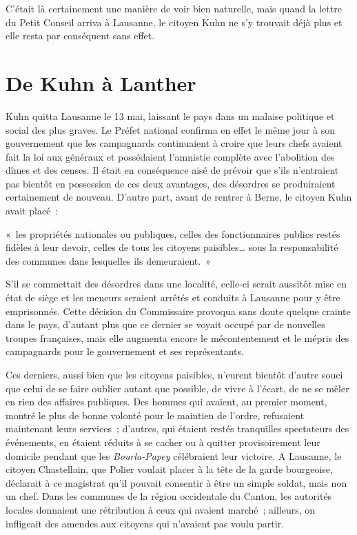 \documentclass[french,twoside]{book} %
\newenvironment{quoteblock}%
  {\begin{quoting}}
  {\end{quoting}}
\newenvironment{quotebar}{%
    \def\FrameCommand{{\color{rubric!10!}\vrule width 0.5em} \hspace{0.9em}}%
    \def\OuterFrameSep{\itemsep} %
    \MakeFramed {\advance\hsize-\width \FrameRestore}
  }%
  {%
    \endMakeFramed
  }
\renewenvironment{quoteblock}%
  {%
    \savenotes
    \setstretch{0.9}
    \normalfont
    \begin{quotebar}
  }
  {%
    \end{quotebar}
    \spewnotes
  }
\begin{document}
\noindent C’était là certainement une manière de voir bien naturelle, mais quand la lettre du Petit Conseil arriva à Lausanne, le citoyen Kuhn ne s’y trouvait déjà plus et elle resta par conséquent sans effet.
\section[De Kuhn à Lanther]{De Kuhn à Lanther}
\noindent Kuhn quitta Lausanne le 13 mai, laissant le pays dans un malaise politique et social des plus graves. Le Préfet national confirma en effet le même jour à son gouvernement que les campagnards continuaient à croire que leurs chefs avaient fait la loi aux généraux et possédaient l’amnistie complète avec l’abolition des dîmes et des censes. Il était en conséquence aisé de prévoir que s’ils n’entraient pas bientôt en possession de ces deux avantages, des désordres se produiraient certainement de nouveau. D’autre part, avant de rentrer à Berne, le citoyen Kuhn avait placé :\par

\begin{quoteblock}
\noindent « les propriétés nationales ou publiques, celles des fonctionnaires publics restés fidèles à leur devoir, celles de tous les citoyens paisibles… sous la responsabilité des communes dans lesquelles ils demeuraient. »\end{quoteblock}

\noindent S’il se commettait des désordres dans une localité, celle-ci serait aussitôt mise en état de siège et les meneurs seraient arrêtés et conduits à Lausanne pour y être emprisonnés. Cette décision du Commissaire provoqua sans doute quelque crainte dans le pays, d’autant plus que ce dernier se voyait occupé par de nouvelles troupes françaises, mais elle augmenta encore le mécontentement et le mépris des campagnards pour le gouvernement et ses représentants.\par
Ces derniers, aussi bien que les citoyens paisibles, n’eurent bientôt d’autre souci que celui de se faire oublier autant que possible, de vivre à l’écart, de ne se mêler en rien des affaires publiques. Des hommes qui avaient, au premier moment, montré le plus de bonne volonté pour le maintien de l’ordre, refusaient maintenant leurs services ; d’autres, qui étaient restés tranquilles spectateurs des événements, en étaient réduits à se cacher ou à quitter provisoirement leur domicile pendant que les \emph{Bourla-Papey} célébraient leur victoire. A Lausanne, le citoyen Chastellain, que Polier voulait placer à la tête de la garde bourgeoise, déclarait à ce magistrat qu’il pouvait consentir à être un simple soldat, mais non un chef. Dans les communes de la région occidentale du Canton, les autorités locales donnaient une rétribution à ceux qui avaient marché ; ailleurs, on infligeait des amendes aux citoyens qui n’avaient pas voulu partir.\par
\end{document}
